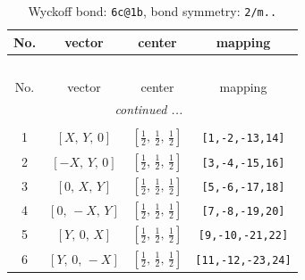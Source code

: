 \documentclass[fleqn,8pt]{jsarticle}
\begin{document}
\renewcommand{\arraystretch}{1.2}
\begin{longtable}{cccc}
\caption{Wyckoff bond: {\tt 6c@1b}, bond symmetry: {\tt 2/m..}}
 \\
 \hline \hline
No. & vector & center & mapping \\ \hline \endfirsthead

\multicolumn{3}{l}{\tablename\ \thetable{}} \\
 \hline \hline
No. & vector & center & mapping \\ \hline \endhead

 \hline \hline
\multicolumn{3}{r}{\footnotesize\it continued ...} \\ \endfoot

 \hline \hline
\multicolumn{3}{r}{} \\ \endlastfoot

1 & $\left[ X,\, Y,\, 0 \right]$ & $\left[ \frac{1}{2},\, \frac{1}{2},\, \frac{1}{2} \right]$ & {\tt [1,-2,-13,14]} \\ \hline
2 & $\left[ - X,\, Y,\, 0 \right]$ & $\left[ \frac{1}{2},\, \frac{1}{2},\, \frac{1}{2} \right]$ & {\tt [3,-4,-15,16]} \\ \hline
3 & $\left[ 0,\, X,\, Y \right]$ & $\left[ \frac{1}{2},\, \frac{1}{2},\, \frac{1}{2} \right]$ & {\tt [5,-6,-17,18]} \\ \hline
4 & $\left[ 0,\, - X,\, Y \right]$ & $\left[ \frac{1}{2},\, \frac{1}{2},\, \frac{1}{2} \right]$ & {\tt [7,-8,-19,20]} \\ \hline
5 & $\left[ Y,\, 0,\, X \right]$ & $\left[ \frac{1}{2},\, \frac{1}{2},\, \frac{1}{2} \right]$ & {\tt [9,-10,-21,22]} \\ \hline
6 & $\left[ Y,\, 0,\, - X \right]$ & $\left[ \frac{1}{2},\, \frac{1}{2},\, \frac{1}{2} \right]$ & {\tt [11,-12,-23,24]} \\
\end{longtable}
\renewcommand{\arraystretch}{1.2}
\end{document}
